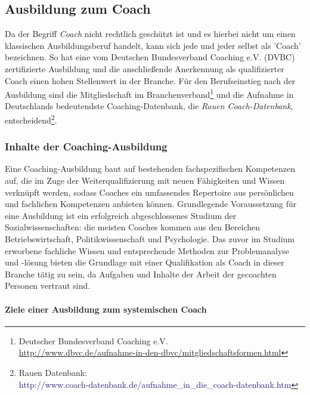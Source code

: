 \documentclass[11pt,a4paper]{article}
\begin{document}
\subsection*{\textsf{Ausbildung zum Coach}}

Da der Begriff \textsl{Coach} nicht rechtlich geschützt ist und es hierbei nicht um einen klassischen Ausbildungsberuf handelt, kann sich jede und jeder selbst als 'Coach' bezeichnen. So hat eine vom Deutschen Bundesverband Coaching e.V. (DVBC) zertifizierte Ausbildung und die anschließende Anerkennung als qualifizierter Coach einen hohen Stellenwert in der Branche. Für den Berufseinstieg nach der Ausbildung sind die Mitgliedschaft im Branchenverband\footnote{Deutscher Bundesverband Coaching e.V.\\ \textsf{\textcolor{MidnightBlue}{\url{http://www.dbvc.de/aufnahme-in-den-dbvc/mitgliedschaftsformen.html}}}} und die Aufnahme in Deutschlands bedeutendste Coaching-Datenbank, die \textsl{Rauen Coach-Datenbank}, entscheidend\footnote{Rauen Datenbank:\\\textsf{\textcolor{MidnightBlue}{http://www.coach-datenbank.de/aufnahme\_in\_die\_coach-datenbank.htm}}}.

\subsubsection*{\textsf{Inhalte der Coaching-Ausbildung}}

Eine Coaching-Ausbildung baut auf bestehenden fachspezifischen Kompetenzen auf, die im Zuge der Weiterqualifizierung mit neuen Fähigkeiten und Wissen verknüpft werden, sodass Coaches ein umfassendes Repertoire aus persönlichen und fachlichen Kompetenzen anbieten können. Grundlegende Voraussetzung für eine Ausbildung ist ein erfolgreich abgeschlossenes Studium der Sozialwissenschaften: die meisten Coaches kommen aus den Bereichen Betriebswirtschaft, Politikwissenschaft und Psychologie. Das zuvor im Studium erworbene fachliche Wissen und entsprechende Methoden zur Problemanalyse und -lösung bieten die Grundlage mit einer Qualifikation als Coach in dieser Branche tätig zu sein, da Aufgaben und Inhalte der Arbeit der gecoachten Personen vertraut sind.

\paragraph*{\textsf{Ziele einer Ausbildung zum systemischen Coach}}
\end{document}
